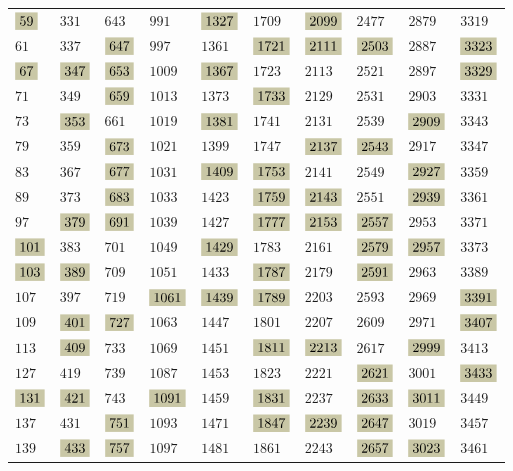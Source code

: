 \documentclass{article}
\newcommand{\highlight}[1]{\colorbox{shadecolor}{$\displaystyle #1$}}
\begin{document}
\begin{center}
{\begin{tabular}{x{1cm}x{1cm}x{1cm}x{1cm}x{1cm}x{1cm}x{1cm}x{1cm}x{1cm}x{1cm}}
$\highlight{59}$ & $331$ & $643$ & 	$991$ & $\highlight{1327}$ & $1709$ & $\highlight{2099}$ & $2477$ & $2879$ & $3319$ \tabularnewline
$61$ & $337$ & $\highlight{647}$ & $997$ & $1361$ & $\highlight{1721}$ & $\highlight{2111}$ & $\highlight{2503}$ & $2887$ & $\highlight{3323}$ \tabularnewline
$\highlight{67}$ & $\highlight{347}$ & $\highlight{653}$ & $1009$ & $\highlight{1367}$ & $1723$ & $2113$ & $2521$ & $2897$ & $\highlight{3329}$ \tabularnewline
$71$ & $349$ & $\highlight{659}$ & $1013$ & $1373$ & $\highlight{1733}$ & $2129$ & $2531$ & $2903$ & $3331$ \tabularnewline
$73$ & $\highlight{353}$ & $661$ & $1019$ & $\highlight{1381}$ & $1741$ & $2131$ & $2539$ & $\highlight{2909}$ & $3343$ \tabularnewline
$79$ & $359$ & $\highlight{673}$ & $1021$ & $1399$ & $1747$ & $\highlight{2137}$ & $\highlight{2543}$ & $2917$ & $3347$ \tabularnewline
$83$ & $367$ & $\highlight{677}$ & $1031$ & $\highlight{1409}$ & $\highlight{1753}$ & $2141$ & $2549$ & $\highlight{2927}$ & $3359$ \tabularnewline
$89$ & $373$ & $\highlight{683}$ & $1033$ & $1423$ & $\highlight{1759}$ & $\highlight{2143}$ & $2551$ & $\highlight{2939}$ & $3361$ \tabularnewline
$97$ & $\highlight{379}$ & $\highlight{691}$ & $1039$ & $1427$ & $\highlight{1777}$ & $\highlight{2153}$ & $\highlight{2557}$ & $2953$ & $3371$ \tabularnewline
$\highlight{101}$ & $383$ & $701$ & $1049$ & $\highlight{1429}$ & $1783$ & $2161$ & $\highlight{2579}$ & $\highlight{2957}$ & $3373$ \tabularnewline
$\highlight{103}$ & $\highlight{389}$ & $709$ & $1051$ & $1433$ & $\highlight{1787}$ & $2179$ & $\highlight{2591}$ & $2963$ & $3389$ \tabularnewline
$107$ & $397$ & $719$ & $\highlight{1061}$ & $\highlight{1439}$ & $\highlight{1789}$ & $2203$ & $2593$ & $2969$ & $\highlight{3391}$ \tabularnewline
$109$ & $\highlight{401}$ & $\highlight{727}$ & $1063$ & $1447$ & $1801$ & $2207$ & $2609$ & $2971$ & $\highlight{3407}$ \tabularnewline
$113$ & $\highlight{409}$ & $733$ & $1069$ & $1451$ & $\highlight{1811}$ & $\highlight{2213}$ & $2617$ & $\highlight{2999}$ & $3413$ \tabularnewline
$127$ & $419$ & $739$ & $1087$ & $1453$ & $1823$ & $2221$ & $\highlight{2621}$ & $3001$ & $\highlight{3433}$ \tabularnewline
$\highlight{131}$ & $\highlight{421}$ & $743$ & $\highlight{1091}$ & $1459$ & $\highlight{1831}$ & $2237$ & $\highlight{2633}$ & $\highlight{3011}$ & $3449$ \tabularnewline
$137$ & $431$ & $\highlight{751}$ & $1093$ & $1471$ & $\highlight{1847}$ & $\highlight{2239}$ & $\highlight{2647}$ & $3019$ & $3457$ \tabularnewline
$139$ & $\highlight{433}$ & $\highlight{757}$ & $1097$ & $1481$ & $1861$ & $2243$ & $\highlight{2657}$ & $\highlight{3023}$ & $3461$ \tabularnewline

\end{tabular}}
\end{center}
\end{document}
